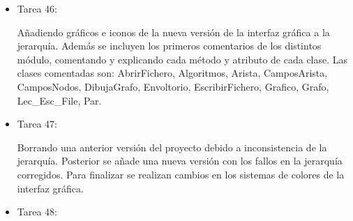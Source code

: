 \begin{itemize}
\item Tarea 46:

Añadiendo gráficos e iconos de la nueva versión de la interfaz gráfica a la jerarquía. Además se incluyen los primeros comentarios de los distintos módulo, comentando y explicando cada método y atributo de cada clase. Las clases comentadas son: AbrirFichero, Algoritmos, Arista, CamposArista, CamposNodos, DibujaGrafo, Envoltorio, EscribirFichero, Grafico, Grafo, Lec\_Esc\_File, Par. \\

\item Tarea 47:

Borrando una anterior versión del proyecto debido a inconsistencia de la jerarquía. Posterior se añade una nueva versión con los fallos en la jerarquía corregidos. Para finalizar se realizan cambios en los sistemas de colores de la interfaz gráfica. \\

\item Tarea 48:


\end{itemize}

